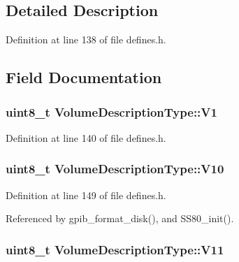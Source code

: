 \subsection{Detailed Description}


Definition at line 138 of file defines.\-h.



\subsection{Field Documentation}
\hypertarget{structVolumeDescriptionType_a179b7af780dd2a93dcb095d12690f6fa}{
\subsubsection[{V1}]{\setlength{\rightskip}{0pt plus 5cm}uint8\-\_\-t Volume\-Description\-Type\-::\-V1}}\label{structVolumeDescriptionType_a179b7af780dd2a93dcb095d12690f6fa}


Definition at line 140 of file defines.\-h.

\hypertarget{structVolumeDescriptionType_ac75ed59ba452ed86278e43e6fc5adec1}{
\subsubsection[{V10}]{\setlength{\rightskip}{0pt plus 5cm}uint8\-\_\-t Volume\-Description\-Type\-::\-V10}}\label{structVolumeDescriptionType_ac75ed59ba452ed86278e43e6fc5adec1}


Definition at line 149 of file defines.\-h.



Referenced by gpib\-\_\-format\-\_\-disk(), and S\-S80\-\_\-init().

\hypertarget{structVolumeDescriptionType_ad9ead8ed6e1eff85d9f1fde20c0ba60d}{
\subsubsection[{V11}]{\setlength{\rightskip}{0pt plus 5cm}uint8\-\_\-t Volume\-Description\-Type\-::\-V11}}\label{structVolumeDescriptionType_ad9ead8ed6e1eff85d9f1fde20c0ba60d}


